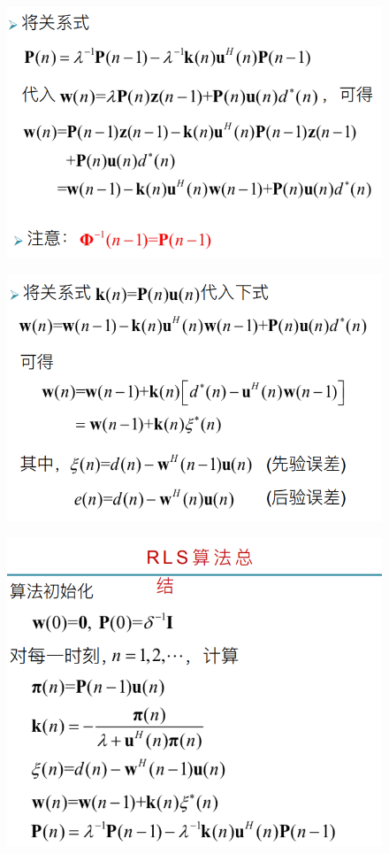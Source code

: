 \documentclass[UTF8]{ctexart} %
\begin{document}
				\begin{figure}[H]
					\centering\includegraphics[scale=0.4]{63.png}
				\end{figure}
				\begin{figure}[H]
					\centering\includegraphics[scale=0.45]{64.png}
				\end{figure}
				\begin{figure}[H]
					\centering\includegraphics[scale=0.4]{65.png}
				\end{figure}
				
\end{document}
